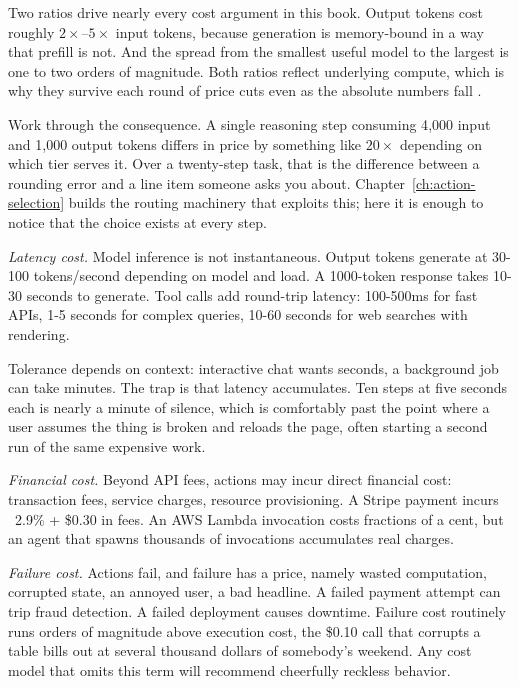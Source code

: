 Two ratios drive nearly every cost argument in this book. Output tokens cost roughly $2\times$--$5\times$ input tokens, because generation is memory-bound in a way that prefill is not. And the spread from the smallest useful model to the largest is one to two orders of magnitude. Both ratios reflect underlying compute, which is why they survive each round of price cuts even as the absolute numbers fall \cite{tokeneconomics2026}.

Work through the consequence. A single reasoning step consuming 4{,}000 input and 1{,}000 output tokens differs in price by something like $20\times$ depending on which tier serves it. Over a twenty-step task, that is the difference between a rounding error and a line item someone asks you about. Chapter~\ref{ch:action-selection} builds the routing machinery that exploits this; here it is enough to notice that the choice exists at every step.

\textit{Latency cost.} Model inference is not instantaneous. Output tokens generate at 30-100 tokens/second depending on model and load. A 1000-token response takes 10-30 seconds to generate. Tool calls add round-trip latency: 100-500ms for fast APIs, 1-5 seconds for complex queries, 10-60 seconds for web searches with rendering.

Tolerance depends on context: interactive chat wants seconds, a background job can take minutes. The trap is that latency accumulates. Ten steps at five seconds each is nearly a minute of silence, which is comfortably past the point where a user assumes the thing is broken and reloads the page, often starting a second run of the same expensive work.

\textit{Financial cost.} Beyond API fees, actions may incur direct financial cost: transaction fees, service charges, resource provisioning. A Stripe payment incurs ~2.9\% + \$0.30 in fees. An AWS Lambda invocation costs fractions of a cent, but an agent that spawns thousands of invocations accumulates real charges.

\textit{Failure cost.} Actions fail, and failure has a price, namely wasted computation, corrupted state, an annoyed user, a bad headline. A failed payment attempt can trip fraud detection. A failed deployment causes downtime. Failure cost routinely runs orders of magnitude above execution cost, the \$0.10 call that corrupts a table bills out at several thousand dollars of somebody's weekend. Any cost model that omits this term will recommend cheerfully reckless behavior.


